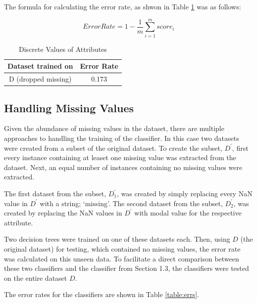 \documentclass{article}
\begin{document}
\noindent The formula for calculating the error rate, as shwon in Table \ref{table:origErr} was as follows:

        
        \[Error Rate = 1 - \frac{1}{m} \sum_{i = 1}^{m} score_{i}\]
        



\begin{table}
        \centering
\begin{tabular}{ |c|c|}
        \hline
        Dataset trained on & Error Rate\\
        \hline
        D (dropped missing) & 0.173\\
        \hline
       \end{tabular}
\caption{Discrete Values of Attributes}
        \label{table:origErr}
\end{table}




\subsection{Handling Missing Values}

Given the abundance of missing values in the dataset, there are multiple approaches to handling the training of the classifier. In this case
two datasets were created from a subset of the original dataset. To create the subset, $D^{\prime}$, first every instance containing at leaset one missing value was extracted from the dataset. Next, an equal number of instances containing no
missing values were extracted.

\vspace{2mm}
The first dataset from the subset, $D^{\prime}_{1}$, was created by simply replacing every NaN value in $D^{\prime}$ with a string; `missing'.
The second dataset from the subset, $D^{\prime}_{2}$, was created by replacing the NaN values in $D^{\prime}$ with modal value for the respective attribute.

\vspace{2mm}
Two decision trees were trained on one of these datasets each. Then, using $D$ (the original dataset) for testing, which contained no missing values, 
the error rate was calculated on this unseen data. To facilitate a direct comparison between these two classifiers and the classifier from Section 1.3,
the classifiers were tested on the entire dataset $D$.

\vspace{2mm}

The error rates for the classifiers are shown in Table \ref{table:errs}.
\end{document}
